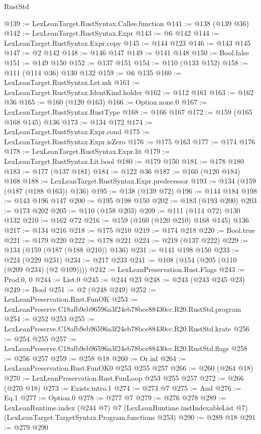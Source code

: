 \begin{lexlean}{RustStd}
\begin{coremodule}
@139 := LexLeanTarget.RustSyntax.Callee.function
@141 := @138 (@139 @36)
@142 := LexLeanTarget.RustSyntax.Expr
@143 := @6 @142
@144 := LexLeanTarget.RustSyntax.Expr.copy
@145 := @144 @123
@146 := @143 @145
@147 := @2 @142
@148 := @146 @147
@149 := @141 @148
@150 := Bool.false
@151 := @149 @150
@152 := @137 @151
@154 := @110 (@133 @152)
@158 := @111 (@114 @36) @130 @132
@159 := @6 @135
@160 := LexLeanTarget.RustSyntax.Let.mk
@161 := LexLeanTarget.RustSyntax.IdentKind.holder
@162 := @112 @161
@163 := @162 @36
@165 := @160 (@120 @163)
@166 := Option.none.{0}
@167 := LexLeanTarget.RustSyntax.RustType
@168 := @166 @167
@172 := @159 (@165 @168 @145) @136
@173 := @134 @172
@174 := LexLeanTarget.RustSyntax.Expr.cond
@175 := LexLeanTarget.RustSyntax.Expr.isZero
@176 := @175 @163
@177 := @174 @176
@178 := LexLeanTarget.RustSyntax.Expr.lit
@179 := LexLeanTarget.RustSyntax.Lit.bool
@180 := @179 @150
@181 := @178 @180
@183 := @177 (@137 @181)
@184 := @122 @36
@187 := @160 (@120 @184) @168
@188 := LexLeanTarget.RustSyntax.Expr.predecessor
@193 := @134 (@159 (@187 (@188 @163)) @136)
@195 := @138 (@139 @72)
@196 := @144 @184
@198 := @143 @196 @147
@200 := @195 @198 @150
@202 := @183 (@193 @200)
@203 := @173 @202
@205 := @110 (@158 @203)
@209 := @111 (@114 @72) @130 @132
@210 := @162 @72
@216 := @159 (@160 (@120 @210) @168 @145) @136
@217 := @134 @216
@218 := @175 @210
@219 := @174 @218
@220 := Bool.true
@221 := @179 @220
@222 := @178 @221
@224 := @219 (@137 @222)
@229 := @134 (@159 (@187 (@188 @210)) @136)
@231 := @141 @198 @150
@233 := @224 (@229 @231)
@234 := @217 @233
@241 := @108 (@154 (@205 (@110 (@209 @234) (@2 @109))))
@242 := LexLeanPreservation.Rust.Flags
@243 := Prod.{0, 0}
@244 := List.{0}
@245 := @244 @23
@248 := @243 (@243 @245 @23)
@249 := Bool
@251 := @2 (@248 @249)
@252 := LexLeanPreservation.Rust.FunOK
@253 := LexLeanPreserve.C18afb9eb96596a3f24eb78bce88430cc.R20.RustStd.program
@254 := @252 @253
@255 := LexLeanPreserve.C18afb9eb96596a3f24eb78bce88430cc.R20.RustStd.krate
@256 := @254 @255
@257 := LexLeanPreserve.C18afb9eb96596a3f24eb78bce88430cc.R20.RustStd.flags
@258 := @256 @257
@259 := @258 @18
@260 := Or.inl
@264 := LexLeanPreservation.Rust.FunOK0 @253 @255 @257
@266 := @260 (@264 @18)
@270 := LexLeanPreservation.Rust.FunLoop @253 @255 @257
@272 := @266 (@270 @18)
@273 := Exists.intro.{1}
@274 := @273 @7
@275 := And
@276 := Eq.{1}
@277 := Option.{0}
@278 := @277 @7
@279 := @276 @278
@289 := LexLeanRuntime.index
    (@244 @7)
    @7
    (LexLeanRuntime.instIndexableList @7)
    (LexLeanTarget.TargetSyntax.Program.functions @253)
@290 := @289 @18
@291 := @279 @290

\end{coremodule}
\end{lexlean}
